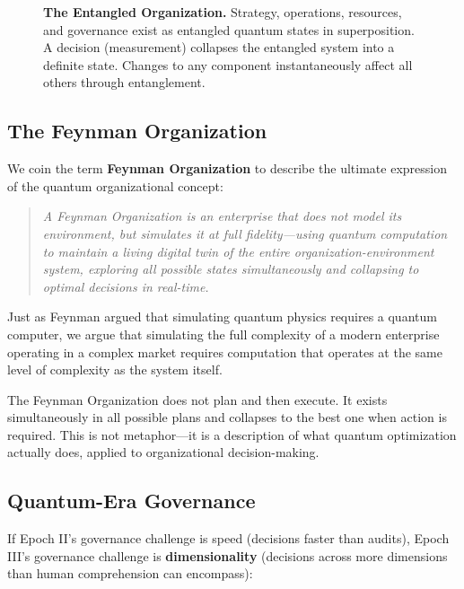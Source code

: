 \documentclass[11pt,a4paper,twocolumn]{article}
\begin{document}
\begin{figure}[t]
{%
}
\caption{\textbf{The Entangled Organization.} Strategy, operations, resources, and governance exist as entangled quantum states in superposition. A decision (measurement) collapses the entangled system into a definite state. Changes to any component instantaneously affect all others through entanglement.}
\label{fig:entangled-org}
\end{figure}


\subsection{The Feynman Organization}

We coin the term \textbf{Feynman Organization} to describe the ultimate expression of the quantum organizational concept:

\begin{quote}
\textit{A Feynman Organization is an enterprise that does not model its environment, but simulates it at full fidelity---using quantum computation to maintain a living digital twin of the entire organization-environment system, exploring all possible states simultaneously and collapsing to optimal decisions in real-time.}
\end{quote}

Just as Feynman argued that simulating quantum physics requires a quantum computer, we argue that simulating the full complexity of a modern enterprise operating in a complex market requires computation that operates at the same level of complexity as the system itself.

The Feynman Organization does not plan and then execute. It exists simultaneously in all possible plans and collapses to the best one when action is required. This is not metaphor---it is a description of what quantum optimization actually does, applied to organizational decision-making.

\subsection{Quantum-Era Governance}

If Epoch II's governance challenge is speed (decisions faster than audits), Epoch III's governance challenge is \textbf{dimensionality} (decisions across more dimensions than human comprehension can encompass):
\end{document}
